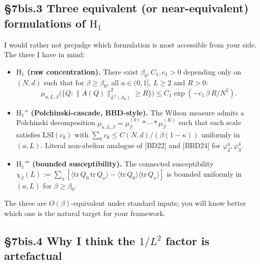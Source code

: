 \documentclass[11pt,a4paper]{article}
\begin{document}
\subsection*{§7bis.3 Three equivalent (or near-equivalent) formulations of $\mathrm{H}_1$}

I would rather not prejudge which formulation is most accessible from your side. The three I have in mind:
\begin{itemize}
  \item \textbf{$\mathrm{H}_1$ (raw concentration).} There exist $\beta_0, C_1, c_1 > 0$ depending only on $(N, d)$ such that for $\beta \ge \beta_0$, all $a \in (0, 1]$, $L \ge 2$ and $R > 0$:
  \[
    \mu_{a, L, \beta}\bigl(\{Q : \|A(Q)\|_{L^2(\Lambda_a)}^2 \ge R\}\bigr) \le C_1 \exp(-c_1\,\beta\,R/N^2).
  \]
  \item \textbf{$\mathrm{H}_1''$ (Polchinski-cascade, BBD-style).} The Wilson measure admits a Polchinski decomposition $\mu_{a, L, \beta} = \mu_\beta^{(0)} \ast \cdots \ast \mu_\beta^{(K)}$ such that each scale satisfies $\mathrm{LSI}(c_k)$ with $\sum_k c_k \le C(N, d)/(\beta(1-\kappa))$ uniformly in $(a, L)$. Literal non-abelian analogue of [BD22] and [BBD24] for $\varphi^4_2, \varphi^4_3$.
  \item \textbf{$\mathrm{H}_1'''$ (bounded susceptibility).} The connected susceptibility $\chi_\beta(L) := \sum_x [\langle\mathrm{tr}\, Q_0 \,\mathrm{tr}\, Q_x\rangle - \langle\mathrm{tr}\, Q_0\rangle\langle\mathrm{tr}\, Q_x\rangle]$ is bounded uniformly in $(a, L)$ for $\beta \ge \beta_0$.
\end{itemize}
The three are $O(\beta)$-equivalent under standard inputs; you will know better which one is the natural target for your framework.

\subsection*{§7bis.4 Why I think the $1/L^2$ factor is artefactual}
\end{document}
